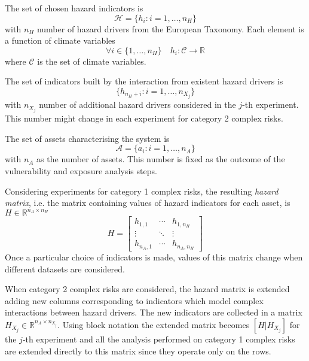 \documentclass{article}
\begin{document}
The set of chosen hazard indicators is
\begin{equation}
  \mathcal{H} = \{ h_i : i = 1, \dots, n_H \}
\end{equation}
with $n_H$ number of hazard drivers from the European Taxonomy.  %
Each element is a function of climate variables
\begin{equation}
  \forall i \in \{ 1, \dots, n_H \} \quad h_i : \mathcal{C} \to \mathbb{R}
\end{equation}
where $\mathcal{C}$ is the set of climate variables.

The set of indicators built by the interaction from existent hazard drivers is
\begin{equation}
  \{ h_{n_H + i} : i = 1, \dots, n_{X_j} \}
\end{equation}
with $n_{X_j}$ number of additional hazard drivers considered in the $j$-th experiment. This number might change in each experiment for category 2 complex risks.

The set of assets characterising the system is
\begin{equation}
  \mathcal{A} = \{ a_i : i = 1, \dots, n_A \}
\end{equation}
with $n_A$ as the number of assets. This number is fixed as the outcome of the vulnerability and exposure analysis steps.

Considering experiments for category 1 complex risks, the resulting \emph{hazard matrix}, i.e. the matrix containing values of hazard indicators for each asset, is $H \in \mathbb{R}^{n_A \times n_H}$
\begin{equation}
  H =
  \begin{bmatrix}
    h_{1, 1}   & \cdots & h_{1, n_H}   \\
    \vdots     & \ddots & \vdots       \\
    h_{n_A, 1} & \cdots & h_{n_A, n_H}
  \end{bmatrix}
\end{equation}
Once a particular choice of indicators is made, values of this matrix change when different datasets are considered.

When category 2 complex risks are considered, the hazard matrix is extended adding new columns corresponding to indicators which model complex interactions between hazard drivers. The new indicators are collected in a matrix $H_{X_j} \in \mathbb{R}^{n_A \times n_{X_j}}$.
Using block notation the extended matrix becomes $[H | H_{X_j}]$ for the $j$-th experiment and all the analysis performed on category 1 complex risks are extended directly to this matrix since they operate only on the rows.
\end{document}
